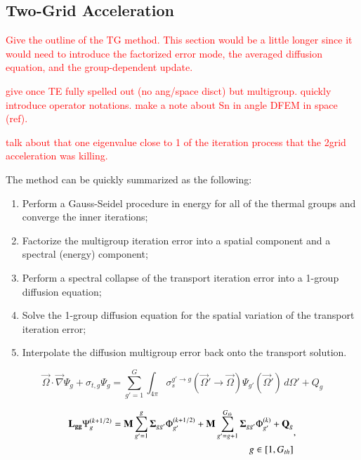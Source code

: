 \documentclass[preprint,10pt]{elsarticle}
\newcommand{\tcr}[1]{\textcolor{red}{#1}}
\begin{document}
\subsection{Two-Grid Acceleration}

\tcr{Give the outline of the TG method. This section would be a little longer since it would need to introduce the factorized error mode, the averaged diffusion equation, and the group-dependent update.}

\tcr{give once TE fully spelled out (no ang/space disct) but multigroup. quickly introduce operator notations. make a note about Sn in angle DFEM in space (ref).}

\tcr{talk about that one eigenvalue close to 1 of the iteration process that the 2grid acceleration was killing.}

The method can be quickly summarized as the following:

\begin{enumerate}
\item Perform a Gauss-Seidel procedure in energy for all of the thermal groups and converge the inner iterations;
\item Factorize the multigroup iteration error into a spatial component and a spectral (energy) component;
\item Perform a spectral collapse of the transport iteration error into a 1-group diffusion equation;
\item Solve the 1-group diffusion equation for the spatial variation of the transport iteration error;
\item Interpolate the diffusion multigroup error back onto the transport solution.
\end{enumerate}

\begin{equation}
\label{eq::MG_trans_eq}
  \vec{\Omega} \cdot \vec{\nabla} \Psi_g+ \sigma_{t,g}  \Psi_g =  \sum_{g'=1}^{G}   \int_{4 \pi} \sigma_{s}^{g' \rightarrow g} (\vec{\Omega}' \rightarrow \vec{\Omega} ) \Psi_{g'} (\vec{\Omega}')  \, d\Omega'   + Q_g
\end{equation}

\begin{equation}
\label{eq::DSA_TG_GS_trans_it_eq}
\begin{aligned}
{\bf L_{gg}} \Psi_g^{(k+1/2)} = {\bf M} \sum_{g'=1}^g {\bf \Sigma}_{g g'} \Phi_{g'}^{(k+1/2)} + {\bf M} \sum_{g'=g+1}^{G_{th}} {\bf \Sigma}_{g g'} \Phi_{g'}^{(k)} + {\bf Q}_g  \\
g \in [1,G_{th}]
\end{aligned} ,
\end{equation}
\end{document}
